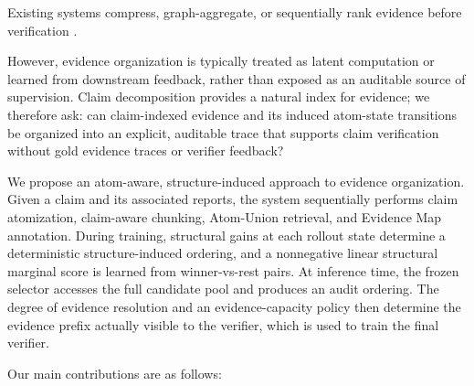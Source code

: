 \documentclass[letterpaper]{article}
\begin{document}
Existing systems compress, graph-aggregate, or sequentially rank
evidence before verification
\citep{Yang2022CofCED,Zhou2019GEAR,Aly2022NaturalLogic,
Zhang2024FFRR}.


However, evidence organization is typically treated as latent
computation or learned from downstream feedback, rather than exposed
as an auditable source of supervision. Claim decomposition provides a
natural index for evidence; we therefore ask: can claim-indexed evidence and its induced atom-state transitions be organized into an explicit, auditable trace that supports claim verification without gold evidence traces or verifier feedback?

We propose an atom-aware, structure-induced approach to evidence organization. Given a claim and its associated reports, the system sequentially performs claim atomization, claim-aware chunking, Atom-Union retrieval, and Evidence Map annotation. During training, structural gains at each rollout state determine a deterministic structure-induced ordering, and a nonnegative linear structural marginal score is learned from winner-vs-rest pairs. At inference time, the frozen selector accesses the full candidate pool and produces an audit ordering. The degree of evidence resolution and an evidence-capacity policy then determine the evidence prefix actually visible to the verifier, which is used to train the final verifier.

Our main contributions are as follows:


\end{document}
